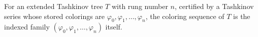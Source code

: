 \begin{definition}
For an extended Tashkinov tree \(T\) with rung number \(n\), certified by
a Tashkinov series whose stored colorings are
\(\varphi_0,\varphi_1,\ldots,\varphi_n\), the coloring sequence of \(T\)
is the indexed family
\((\varphi_0,\varphi_1,\ldots,\varphi_n)\) itself.
\end{definition}
